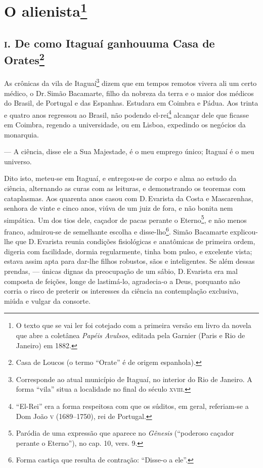 \chapter{O alienista\footnote[*]{O texto que se vai ler foi cotejado com a
  primeira versão em livro da novela que abre a coletânea \emph{Papéis
  Avulsos}, editada pela Garnier (Paris e Rio de Janeiro) em 1882.}}


\section*{\textsc{i}. De como Itaguaí ganhou\break uma Casa de Orates\protect\footnote[\dagger]{\MakeUppercase{C}asa de \MakeUppercase{L}oucos (o termo ``\MakeUppercase{O}rate'' é de origem espanhola).}}

\noindent{}As crônicas da vila de Itaguaí\footnote{Corresponde ao atual município
  de Itaguaí, no interior do Rio de Janeiro. A forma ``vila'' situa a
  localidade no final do século \textsc{xviii}.} dizem que em tempos remotos
vivera ali um certo médico, o Dr.\,Simão Bacamarte, filho da nobreza da
terra e o maior dos médicos do Brasil, de Portugal e das Espanhas.
Estudara em Coimbra e Pádua. Aos trinta e quatro anos regressou ao
Brasil, não podendo el-rei\footnote{``El-Rei'' era a forma respeitosa
  com que os súditos, em geral, referiam-se a Dom João \textsc{v} (1689--1750),
  rei de Portugal.} alcançar dele que ficasse em Coimbra, regendo a
universidade, ou em Lisboa, expedindo os negócios da monarquia.

--- A ciência, disse ele a Sua Majestade, é o meu emprego único; Itaguaí
é o meu universo.

Dito isto, meteu-se em Itaguaí, e entregou-se de corpo e alma ao estudo
da ciência, alternando as curas com as leituras, e demonstrando os
teoremas com cataplasmas. Aos quarenta anos casou com D.\,Evarista da
Costa e Mascarenhas, senhora de vinte e cinco anos, viúva de um juiz de
fora, e não bonita nem simpática. Um dos tios dele, caçador de pacas
perante o Eterno\footnote{Paródia de uma expressão que aparece no
  \emph{Gênesis} (``poderoso caçador perante o Eterno''), no cap. 10,
  vers. 9.}, e não menos franco, admirou-se de semelhante escolha e
disse-lho\footnote{Forma castiça que resulta de contração: ``Disse-o a
  ele''.}. Simão Bacamarte explicou-lhe que D.\,Evarista reunia condições
fisiológicas e anatômicas de primeira ordem, digeria com facilidade,
dormia regularmente, tinha bom pulso, e excelente vista; estava assim
apta para dar-lhe filhos robustos, sãos e inteligentes. Se além dessas
prendas, --- únicas dignas da preocupação de um sábio, D.\,Evarista era
mal composta de feições, longe de lastimá-lo, agradecia-o a Deus,
porquanto não corria o risco de preterir os interesses da ciência na
contemplação exclusiva, miúda e vulgar da consorte.

